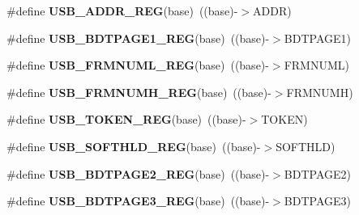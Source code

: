 \begin{DoxyCompactItemize}
\item 
\#define {\bfseries U\+S\+B\+\_\+\+A\+D\+D\+R\+\_\+\+R\+EG}(base)~((base)-\/$>$A\+D\+DR)\hypertarget{group__USB__Register__Accessor__Macros_ga325912e3ba69a2bd9e7d7a8c1708f8d5}{}\label{group__USB__Register__Accessor__Macros_ga325912e3ba69a2bd9e7d7a8c1708f8d5}

\item 
\#define {\bfseries U\+S\+B\+\_\+\+B\+D\+T\+P\+A\+G\+E1\+\_\+\+R\+EG}(base)~((base)-\/$>$B\+D\+T\+P\+A\+G\+E1)\hypertarget{group__USB__Register__Accessor__Macros_gaceabcb5760b3521c323a2a274d692357}{}\label{group__USB__Register__Accessor__Macros_gaceabcb5760b3521c323a2a274d692357}

\item 
\#define {\bfseries U\+S\+B\+\_\+\+F\+R\+M\+N\+U\+M\+L\+\_\+\+R\+EG}(base)~((base)-\/$>$F\+R\+M\+N\+U\+ML)\hypertarget{group__USB__Register__Accessor__Macros_ga165dc318202eb67407c845711a774a38}{}\label{group__USB__Register__Accessor__Macros_ga165dc318202eb67407c845711a774a38}

\item 
\#define {\bfseries U\+S\+B\+\_\+\+F\+R\+M\+N\+U\+M\+H\+\_\+\+R\+EG}(base)~((base)-\/$>$F\+R\+M\+N\+U\+MH)\hypertarget{group__USB__Register__Accessor__Macros_gaa74a86752b5b1c0effc265f2bc9751da}{}\label{group__USB__Register__Accessor__Macros_gaa74a86752b5b1c0effc265f2bc9751da}

\item 
\#define {\bfseries U\+S\+B\+\_\+\+T\+O\+K\+E\+N\+\_\+\+R\+EG}(base)~((base)-\/$>$T\+O\+K\+EN)\hypertarget{group__USB__Register__Accessor__Macros_ga14b16a54d217cc3564ff273a9da5120b}{}\label{group__USB__Register__Accessor__Macros_ga14b16a54d217cc3564ff273a9da5120b}

\item 
\#define {\bfseries U\+S\+B\+\_\+\+S\+O\+F\+T\+H\+L\+D\+\_\+\+R\+EG}(base)~((base)-\/$>$S\+O\+F\+T\+H\+LD)\hypertarget{group__USB__Register__Accessor__Macros_ga93a35e99748245a1eb946023333f7c2a}{}\label{group__USB__Register__Accessor__Macros_ga93a35e99748245a1eb946023333f7c2a}

\item 
\#define {\bfseries U\+S\+B\+\_\+\+B\+D\+T\+P\+A\+G\+E2\+\_\+\+R\+EG}(base)~((base)-\/$>$B\+D\+T\+P\+A\+G\+E2)\hypertarget{group__USB__Register__Accessor__Macros_gab286bd6bd7c2c180c34f4d819bc6504e}{}\label{group__USB__Register__Accessor__Macros_gab286bd6bd7c2c180c34f4d819bc6504e}

\item 
\#define {\bfseries U\+S\+B\+\_\+\+B\+D\+T\+P\+A\+G\+E3\+\_\+\+R\+EG}(base)~((base)-\/$>$B\+D\+T\+P\+A\+G\+E3)\hypertarget{group__USB__Register__Accessor__Macros_ga608e340fcaa827bd85910ed2d058a322}{}\label{group__USB__Register__Accessor__Macros_ga608e340fcaa827bd85910ed2d058a322}


\end{DoxyCompactItemize}
